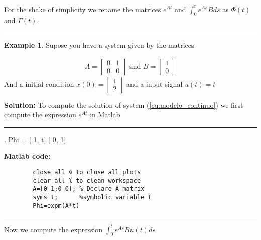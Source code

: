 \documentclass[nols]{tufte-handout}
\theoremstyle{definition}
\newtheorem{exmp}{Example}[section]
\begin{document}
For the shake of simplicity we rename the matrices $e^{At}$  and $\displaystyle\int_0^t e^{As}Bds$ as $\Phi(t)$ and $\Gamma(t)$.


\vspace{1cm}
\hrule height 1pt
\begin{exmp}
    
    Supose you have a system given by the matrices

    \begin{align*}
        A=\begin{bmatrix}
            0 & 1\\
            0 & 0  
        \end{bmatrix}\text{ and }
        B=\begin{bmatrix}
            1\\0
        \end{bmatrix}
    \end{align*}
    And a initial condition $x(0)=\begin{bmatrix} 1\\2\end{bmatrix}$ and a input signal $u(t)=t$

    \textbf{Solution:}
    To compute the solution of system (\ref{eq:modelo_continuo}) we first compute the expression $e^{At}$ in Matlab

    \noindent\hfil\rule{\textwidth}{.4pt}\hfil 
    \begin{verbbox}[\footnotesize]
                                                            .           
Phi =
[ 1, t]
[ 0, 1]    
    \end{verbbox}

    \textbf{Matlab code:}
 
    \begin{verbatim}
        close all % to close all plots
        clear all % to clean workspace
        A=[0 1;0 0]; % Declare A matrix
        syms t;      %symbolic variable t
        Phi=expm(A*t)
    \end{verbatim}
    \noindent\hfil\rule{\textwidth}{.4pt}\hfil 
    Now we compute the expression $\displaystyle\int_0^t e^{As}Bu(t)ds$
    

\end{exmp}
\end{document}
